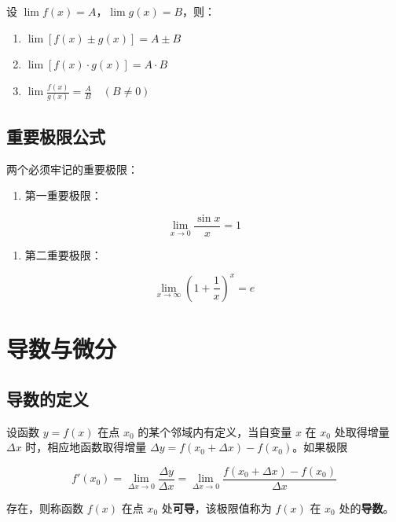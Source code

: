 \documentclass{harryopo-mathnotes}
\begin{document}
设 \(\lim f(x) = A\)，\(\lim g(x) = B\)，则：

\begin{enumerate}
\def\labelenumi{\arabic{enumi}.}
\tightlist
\item
  \(\lim [f(x) \pm g(x)] = A \pm B\)
\item
  \(\lim [f(x) \cdot g(x)] = A \cdot B\)
\item
  \(\lim \frac{f(x)}{g(x)} = \frac{A}{B} \quad (B \neq 0)\)
\end{enumerate}

\subsection{重要极限公式}\label{ux91cdux8981ux6781ux9650ux516cux5f0f}

两个必须牢记的重要极限：

\begin{enumerate}
\def\labelenumi{\arabic{enumi}.}
\tightlist
\item
  第一重要极限：
\end{enumerate}

\[\lim_{x \to 0} \frac{\sin x}{x} = 1\]

\begin{enumerate}
\def\labelenumi{\arabic{enumi}.}
\setcounter{enumi}{1}
\tightlist
\item
  第二重要极限：
\end{enumerate}

\[\lim_{x \to \infty} \left(1 + \frac{1}{x}\right)^x = e\]

\section{导数与微分}\label{ux5bfcux6570ux4e0eux5faeux5206}

\subsection{导数的定义}\label{ux5bfcux6570ux7684ux5b9aux4e49}

设函数 \(y = f(x)\) 在点 \(x_0\) 的某个邻域内有定义，当自变量 \(x\) 在
\(x_0\) 处取得增量 \(\Delta x\) 时，相应地函数取得增量
\(\Delta y = f(x_0 + \Delta x) - f(x_0)\)。如果极限

\[f'(x_0) = \lim_{\Delta x \to 0} \frac{\Delta y}{\Delta x} = \lim_{\Delta x \to 0} \frac{f(x_0 + \Delta x) - f(x_0)}{\Delta x}\]

存在，则称函数 \(f(x)\) 在点 \(x_0\) 处\textbf{可导}，该极限值称为
\(f(x)\) 在 \(x_0\) 处的\textbf{导数}。
\end{document}
